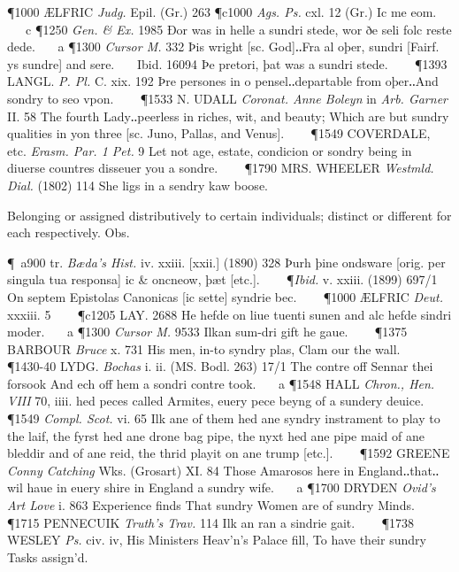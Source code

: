 \begin{description}[wide, labelwidth=!, labelindent=0pt]
\begin{myenumerate}
\P 1000 ÆLFRIC  \textit{Judg.} Epil. (Gr.) 263 
\P c1000 \textit{Ags.  Ps.} cxl. 12 (Gr.) Ic me  eom.    c 
\P 1250 \textit{Gen. \& Ex.} 1985 Ðor was in  helle a sundri stede, wor ðe seli folc reste dede.    a 
\P 1300  \textit{Cursor M.} 332 Þis wright [sc. God]‥Fra al oþer, sundri [Fairf. ys sundre] and sere.    Ibid. 16094 Þe pretori, þat was a sundri stede.    
\P 1393 LANGL.  \textit{P. Pl.} C. xix. 192 Þre persones in o pensel‥departable from oþer‥And sondry to seo vpon.    
\P 1533 N. UDALL  \textit{Coronat. Anne Boleyn} in \textit{Arb. Garner} II. 58 The fourth Lady‥peerless in riches, wit, and beauty; Which are but sundry qualities in yon three [sc. Juno, Pallas, and Venus].    
\P 1549 COVERDALE, etc. \textit{Erasm. Par. 1 Pet.} 9 Let not age, estate, condicion or sondry being in diuerse countres disseuer you a sondre.    
\P 1790 MRS. WHEELER  \textit{Westmld. Dial.} (1802) 114 She ligs in a sendry kaw boose.

 Belonging or assigned distributively to certain individuals; distinct or different for each respectively. Obs.

\P a900 tr. \textit{Bæda's Hist.} iv. xxiii. [xxii.] (1890) 328 Þurh  þine ondsware [orig. per singula tua responsa] ic  \& oncneow, þæt [etc.].    
\P \textit{Ibid.} v. xxiii. (1899) 697/1 On septem Epistolas Canonicas [ic sette] syndrie bec.    
\P 1000 ÆLFRIC  \textit{Deut.} xxxiii. 5     
\P c1205 LAY.  2688 He hefde on liue tuenti sunen and alc hefde sindri moder.    a 
\P 1300  \textit{Cursor M.} 9533 Ilkan sum-dri gift he gaue.    
\P 1375 BARBOUR  \textit{Bruce} x. 731 His men, in-to syndry plas, Clam our the wall.    
\P 1430-40 LYDG.  \textit{Bochas} i. ii. (MS. Bodl. 263) 17/1 The contre off Sennar thei forsook And ech off hem a sondri contre took.    a 
\P 1548 HALL  \textit{Chron., Hen. VIII} 70, iiii. hed peces called Armites, euery pece beyng of a sundery deuice.    
\P 1549  \textit{Compl. Scot.} vi. 65 Ilk ane of them hed ane syndry instrament to play to the laif, the fyrst hed ane drone bag pipe, the nyxt hed ane pipe maid of ane bleddir and of ane reid, the thrid playit on ane trump [etc.].    
\P 1592 GREENE  \textit{Conny Catching} Wks. (Grosart) XI. 84 Those Amarosos here in England‥that‥wil haue in euery shire in England a sundry wife.    a 
\P 1700 DRYDEN  \textit{Ovid's Art Love} i. 863 Experience finds That sundry Women are of sundry Minds.    
\P 1715 PENNECUIK  \textit{Truth's Trav.} 114 Ilk an ran a sindrie gait.    
\P 1738 WESLEY  \textit{Ps.} civ. iv, His Ministers Heav'n's Palace fill, To have their sundry Tasks assign'd.


\end{myenumerate}
\end{description}

